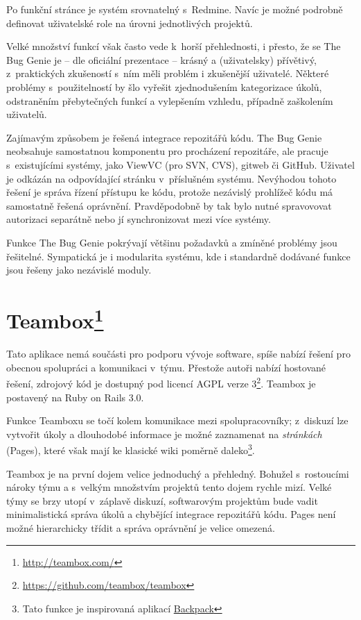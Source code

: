 \documentclass[thesis=B,czech]{FITthesis}[2012/05/02]
\begin{document}
Po funkční stránce je systém srovnatelný s~Redmine. Navíc je možné
podrobně definovat uživatelské role na úrovni jednotlivých projektů.

Velké množství funkcí však často vede k~horší přehlednosti, i přesto, že
se The Bug Genie je -- dle oficiální prezentace -- krásný a
(uživatelsky) přívětivý, z~praktických zkušeností s~ním měli problém i
zkušenější uživatelé. Některé problémy s~použitelností by šlo vyřešit
zjednodušením kategorizace úkolů, odstraněním přebytečných funkcí a
vylepšením vzhledu, případně zaškolením uživatelů.

Zajímavým způsobem je řešená integrace repozitářů kódu. The Bug Genie
neobsahuje samostatnou komponentu pro procházení repozitáře, ale pracuje
s~existujícími systémy, jako ViewVC (pro SVN, CVS), gitweb či GitHub.
Uživatel je odkázán na odpovídající stránku v~příslušném systému.
Nevýhodou tohoto řešení je správa řízení přístupu ke kódu, protože
nezávislý prohlížeč kódu má samostatně řešená oprávnění. Pravděpodobně
by tak bylo nutné spravovovat autorizaci separátně nebo jí
synchronizovat mezi více systémy.

Funkce The Bug Genie pokrývají většinu požadavků a zmíněné problémy jsou
řešitelné. Sympatická je i modularita systému, kde i standardně dodávané
funkce jsou řešeny jako nezávislé moduly.

\section[Teambox]{Teambox\footnote{\url{http://teambox.com/}}}

Tato aplikace nemá součásti pro podporu vývoje software, spíše nabízí
řešení pro obecnou spolupráci a komunikaci v~týmu. Přestože autoři
nabízí hostované řešení, zdrojový kód je dostupný pod licencí \gls{AGPL}
verze 3\footnote{\url{https://github.com/teambox/teambox}}. Teambox je
postavený na Ruby on Rails 3.0.

Funkce Teamboxu se točí kolem komunikace mezi spolupracovníky; z~diskuzí
lze vytvořit úkoly a dlouhodobé informace je možné zaznamenat na
\emph{stránkách} (Pages), které však mají ke klasické wiki poměrně
daleko\footnote{Tato funkce je inspirovaná aplikací
  \href{http://backpackit.com/}{Backpack}}.

Teambox je na první dojem velice jednoduchý a přehledný. Bohužel
s~rostoucími nároky týmu a s~velkým množstvím projektů tento dojem rychle
mizí. Velké týmy se brzy utopí v~záplavě diskuzí, softwarovým projektům
bude vadit minimalistická správa úkolů a chybějící integrace repozitářů
kódu. Pages není možné hierarchicky třídit a správa oprávnění je velice
omezená.
\end{document}
